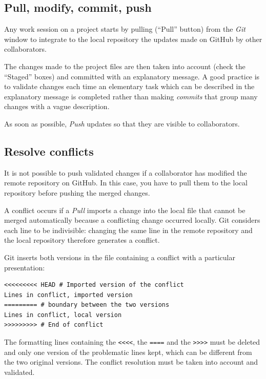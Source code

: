 \documentclass[
  12pt,
  american,
  a4paper,
  extrafontsizes,onecolumn,openright
  ]{memoir}
\begin{document}
\hypertarget{pull-modify-commit-push}{%
\subsection{Pull, modify, commit, push}\label{pull-modify-commit-push}}

Any work session on a project starts by pulling (\enquote{Pull} button) from the \emph{Git} window to integrate to the local repository the updates made on GitHub by other collaborators.

The changes made to the project files are then taken into account (check the \enquote{Staged} boxes) and committed with an explanatory message.
A good practice is to validate changes each time an elementary task which can be described in the explanatory message is completed rather than making \emph{commits} that group many changes with a vague description.

As soon as possible, \emph{Push} updates so that they are visible to collaborators.

\hypertarget{resolve-conflicts}{%
\subsection{Resolve conflicts}\label{resolve-conflicts}}

It is not possible to push validated changes if a collaborator has modified the remote repository on GitHub.
In this case, you have to pull them to the local repository before pushing the merged changes.

A conflict occurs if a \emph{Pull} imports a change into the local file that cannot be merged automatically because a conflicting change occurred locally.
Git considers each line to be indivisible: changing the same line in the remote repository and the local repository therefore generates a conflict.

Git inserts both versions in the file containing a conflict with a particular presentation:

\begin{verbatim}
<<<<<<<<< HEAD # Imported version of the conflict
Lines in conflict, imported version
========= # boundary between the two versions
Lines in conflict, local version
>>>>>>>>> # End of conflict
\end{verbatim}

The formatting lines containing the \texttt{\textless{}\textless{}\textless{}\textless{}}, the \texttt{====} and the \texttt{\textgreater{}\textgreater{}\textgreater{}\textgreater{}} must be deleted and only one version of the problematic lines kept, which can be different from the two original versions.
The conflict resolution must be taken into account and validated.
\end{document}
